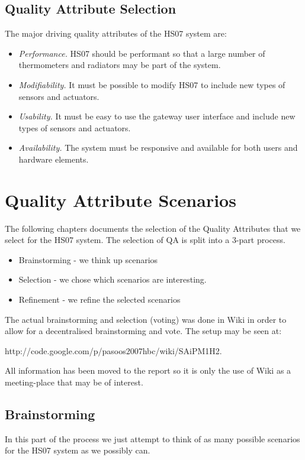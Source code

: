 \documentclass[a4paper,10pt]{article}
\begin{document}
\subsection{Quality Attribute Selection}

The major driving quality attributes of the HS07 system
are:

\begin{itemize}
\item \emph{Performance.} HS07 should be performant so that a large
  number of thermometers and radiators may be part of the system.
\item \emph{Modifiability.} It must be possible to modify HS07 to
  include new types of sensors and actuators.
\item \emph{Usability.} It must be easy to use the gateway user interface
  and include new types of sensors and actuators.
\item \emph{Availability.} The system must be responsive and available for 
both users and hardware elements.
\end{itemize}




\section{Quality Attribute Scenarios}
The following chapters documents the selection of the Quality Attributes that we 
select for the HS07 system. The selection of QA is split into a 3-part process.
\begin{itemize}
\item Brainstorming - we think up scenarios
\item Selection - we chose which scenarios are interesting.
\item Refinement - we refine the selected scenarios
\end{itemize}
The actual brainstorming and selection (voting) was done in Wiki in order to allow for a decentralised brainstorming and vote. The setup may be seen at:
 
http://code.google.com/p/pasoos2007hbc/wiki/SAiPM1H2.

All information has been moved to the report so it is only the use of Wiki as a meeting-place that may be of interest.

\subsection{Brainstorming}
In this part of the process we just attempt to think of as many possible scenarios for the HS07 system as we possibly can. 
\end{document}
